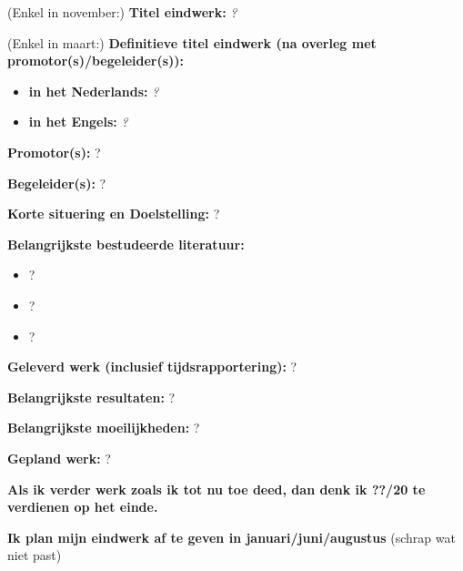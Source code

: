 \documentclass[12pt]{report}
\begin{document}
\pagestyle{myheadings}
(Enkel in november:) {\bf Titel eindwerk:} {\em ?}

\vspace{0.5cm}
(Enkel in maart:) {\bf Definitieve titel eindwerk (na overleg met promotor(s)/begeleider(s)):}
\begin{itemize}
\item {\bf in het Nederlands:} {\em ?}
\item {\bf in het Engels:} {\em ?}
\end{itemize}


\vspace{0.5cm}
{\bf Promotor(s):} ?


\vspace{0.5cm}
{\bf Begeleider(s):} ?

\vspace{1cm}
{\bf Korte situering en Doelstelling: } 
?

\vspace{1cm}
{\bf Belangrijkste bestudeerde literatuur:}
\begin{itemize}
\item ?
\item ?
\item ?
\end{itemize}

\vspace{1cm}
{\bf Geleverd werk (inclusief tijdsrapportering):}
?

\vspace{1cm}
{\bf Belangrijkste resultaten:}
?


\vspace{1cm}
{\bf Belangrijkste moeilijkheden:}
?

\vspace{1cm}
{\bf Gepland werk:} 
?


\vspace{1cm}
{\bf Als ik verder werk zoals ik tot nu toe deed, dan denk ik ??/20 te
    verdienen op het einde.}

{\bf Ik plan mijn eindwerk af te geven in januari/juni/augustus} (schrap wat niet past) 
\end{document}
